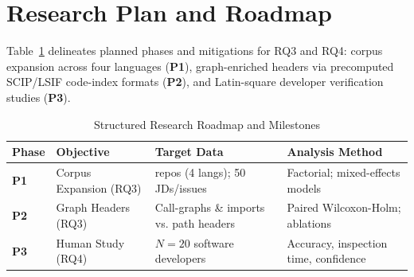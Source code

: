 \section{Research Plan and Roadmap}
\label{sec:plan}

Table~\ref{tab:roadmap} delineates planned phases and mitigations for RQ3 and RQ4: corpus expansion across four languages (\textbf{P1}), graph-enriched headers via precomputed SCIP/LSIF code-index formats (\textbf{P2}), and Latin-square developer verification studies (\textbf{P3}).

\begin{table}[t]
\caption{Structured Research Roadmap and Milestones}
\label{tab:roadmap}
\centering\scriptsize
\setlength{\tabcolsep}{2pt}
\renewcommand{\arraystretch}{0.80}
\begin{threeparttable}
\begin{tabular}{@{}l>{\raggedright\arraybackslash}p{0.80in}>{\raggedright\arraybackslash}p{1.00in}>{\raggedright\arraybackslash}p{1.04in}@{}}
\toprule
Phase & Objective & Target Data & Analysis Method \\
\midrule
\textbf{P1} & Corpus Expansion (RQ3) & 100 repos (4 langs); 50 JDs/issues & Factorial; mixed-effects models \\
\textbf{P2} & Graph Headers (RQ3) & Call-graphs \& imports vs. path headers & Paired Wilcoxon-Holm; ablations \\
\textbf{P3} & Human Study (RQ4) & $N=20$ software developers & Accuracy, inspection time, confidence \\
\bottomrule
\end{tabular}
\end{threeparttable}
\end{table}
